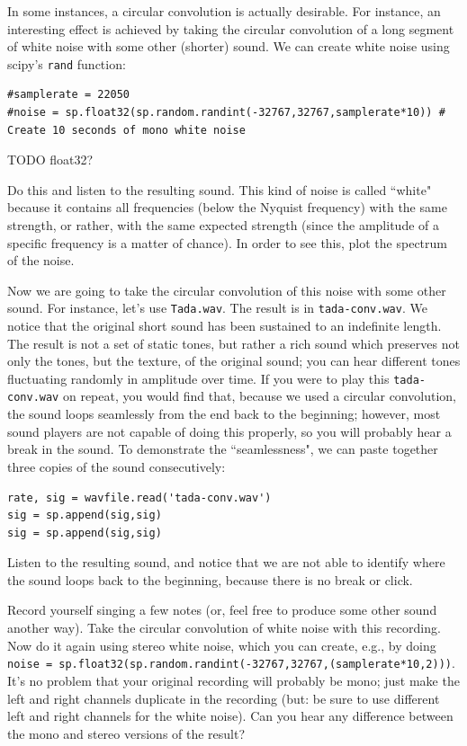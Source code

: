 In some instances, a circular convolution is actually desirable. For instance, an interesting effect is achieved by taking the circular convolution of a long segment of white noise with some other (shorter) sound. We can create white noise using scipy's \texttt{rand} function:
\begin{lstlisting}
#samplerate = 22050
#noise = sp.float32(sp.random.randint(-32767,32767,samplerate*10)) # Create 10 seconds of mono white noise
\end{lstlisting}

TODO float32?

\begin{problem}
Do this and listen to the resulting sound.  This kind of noise is called ``white" because it contains all frequencies (below the Nyquist frequency) with the same strength, or rather, with the same expected strength (since the amplitude of a specific frequency is a matter of chance). In order to see this, plot the spectrum of the noise.
\end{problem}

Now we are going to take the circular convolution of this noise with some other sound. For instance, let's use \texttt{Tada.wav}. The result is in \texttt{tada-conv.wav}. We notice that the original short sound has been sustained to an indefinite length. The result is not a set of static tones, but rather a rich sound which preserves not only the tones, but the texture, of the original sound; you can hear different tones fluctuating randomly in amplitude over time. If you were to play this \texttt{tada-conv.wav} on repeat, you would find that, because we used a circular convolution, the sound loops seamlessly from the end back to the beginning; however, most sound players are not capable of doing this properly, so you will probably hear a break in the sound. To demonstrate the ``seamlessness", we can paste together three copies of the sound consecutively:

\begin{lstlisting}
rate, sig = wavfile.read('tada-conv.wav')
sig = sp.append(sig,sig)
sig = sp.append(sig,sig)
\end{lstlisting}

Listen to the resulting sound, and notice that we are not able to identify where the sound loops back to the beginning, because there is no break or click.

\begin{problem}
Record yourself singing a few notes (or, feel free to produce some other sound another way). Take the circular convolution of white noise with this recording. Now do it again using stereo white noise, which you can create, e.g., by doing \texttt{noise = sp.float32(sp.random.randint(-32767,32767,(samplerate*10,2)))}. It's no problem that your original recording will probably be mono; just make the left and right channels duplicate in the recording (but: be sure to use different left and right channels for the white noise). Can you hear any difference between the mono and stereo versions of the result?
\end{problem}

